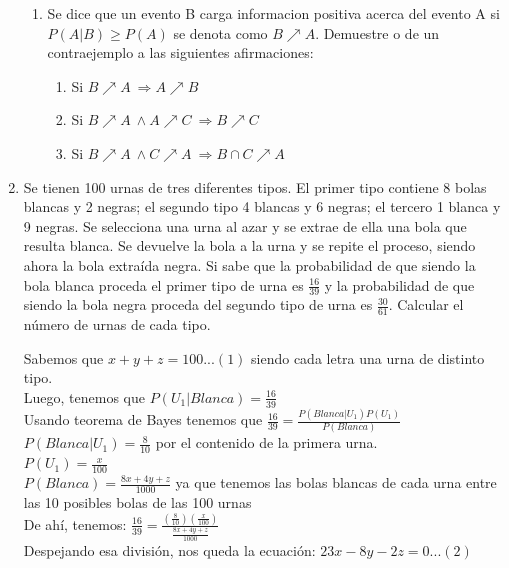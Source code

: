 \documentclass[12pt,a4paper]{report}
\begin{document}
\begin{enumerate}
{\begin{enumerate}[label=\alph*) ]
{   }

   \item {
 Se dice que un evento B carga informacion positiva acerca del evento A si
 $P(A|B) \geq P(A)$ se denota como $B \nearrow A$. Demuestre o de un contraejemplo a las siguientes afirmaciones:
 \begin{enumerate}
 \item{Si $B\nearrow A \ \Rightarrow A\nearrow B$}\\
 \item{Si $B \nearrow A \ \wedge A \nearrow C \ \Rightarrow B \nearrow C$}\\
 \item{Si $B \nearrow A \ \wedge C \nearrow A \ \Rightarrow B\cap C \nearrow A$}
 \end{enumerate}

   }




	\end{enumerate}

	}

   \item {
  	Se tienen 100 urnas de tres diferentes tipos. El primer tipo contiene 8 bolas blancas y 2 negras; el segundo tipo 4 blancas y 6 negras; el tercero 1 blanca y 9 negras. Se selecciona una urna al azar y se extrae de ella una bola que resulta blanca. Se devuelve la bola a la urna y se repite el proceso, siendo ahora la bola extraída negra. Si sabe que la probabilidad de que siendo la bola blanca proceda el primer tipo de urna es $\frac{16}{39}$ y la probabilidad de que siendo la bola negra proceda del segundo tipo de urna es $  \frac{30}{61}$. Calcular el número de urnas de cada tipo.
	
Sabemos que $x + y + z = 100 ...(1)$ siendo cada letra una urna de distinto tipo.\\

Luego, tenemos que $P(U_{1} | Blanca) = \frac{16}{39}$ \\
Usando teorema de Bayes tenemos que $\frac{16}{39} = \frac{P(Blanca| U_{1})P(U_{1})}{P(Blanca)}$\\
$P(Blanca| U_{1}) = \frac{8}{10}$ por el contenido de la primera urna.\\
$P(U_{1}) = \frac{x}{100}$\\
$P(Blanca) = \frac{8x +4y +z}{1000}$ ya que tenemos las bolas blancas de cada urna entre las 10 posibles bolas de las 100 urnas\\
De ahí, tenemos: $\frac{16}{39} = \frac{(\frac{8}{10})(\frac{x}{100})}{\frac{8x +4y +z}{1000}}$\\
Despejando esa división, nos queda la ecuación: $23x -8y-2z = 0 ...(2)$\\

}
\end{enumerate}
\end{document}
